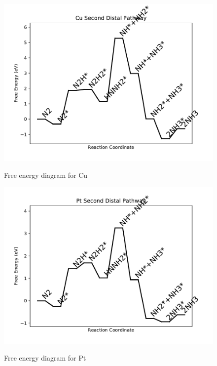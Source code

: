 \documentclass[journal=jacsat,manuscript=article]{achemso}
\begin{document}
\begin{figure}
\includegraphics[width=1\linewidth]{data/plots/Cu_distal_2.pdf}
\label{fig:Cu_distal_2}
\caption{Free energy diagram for Cu}
\end{figure}

\newpage
\begin{figure}
\includegraphics[width=1\linewidth]{data/plots/Pt_distal_2.pdf}
\label{fig:Pt_distal_2}
\caption{Free energy diagram for Pt}
\end{figure}
\end{document}
